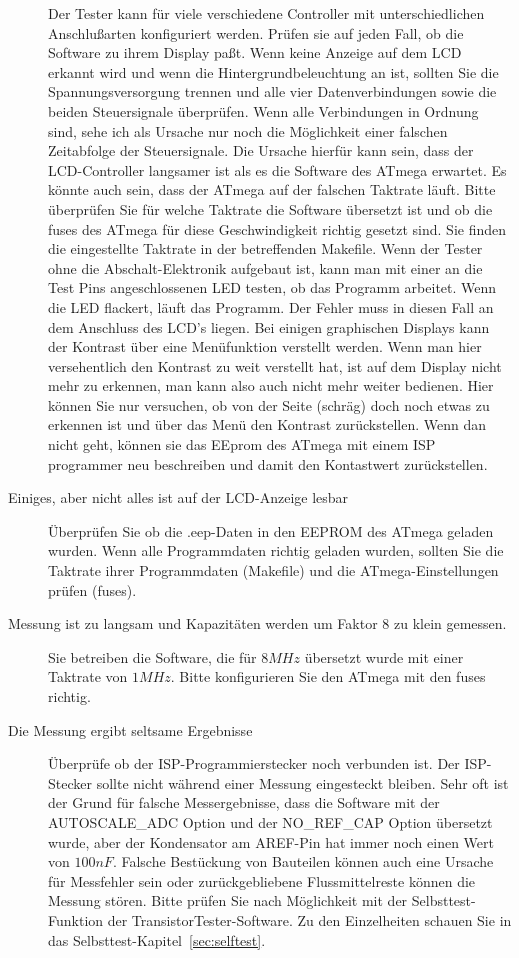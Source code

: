 \begin{description}
Der Tester kann für viele verschiedene Controller mit unterschiedlichen Anschlußarten
konfiguriert werden. Prüfen sie auf jeden Fall, ob die Software zu ihrem Display paßt.
Wenn keine Anzeige auf dem LCD erkannt wird und wenn die Hintergrundbeleuchtung an ist,
sollten Sie die Spannungsversorgung trennen und alle vier Datenverbindungen sowie die 
beiden Steuersignale überprüfen.
Wenn alle Verbindungen in Ordnung sind, sehe ich als Ursache nur noch die Möglichkeit einer
falschen Zeitabfolge der Steuersignale.
Die Ursache hierfür kann sein, dass der LCD-Controller langsamer ist als es die Software
des ATmega erwartet. Es könnte auch sein, dass der ATmega auf der falschen Taktrate läuft.
Bitte überprüfen Sie für welche Taktrate die Software übersetzt ist und ob
die fuses des ATmega für diese Geschwindigkeit richtig gesetzt sind.
Sie finden die eingestellte Taktrate in der betreffenden Makefile.
Wenn der Tester ohne die Abschalt-Elektronik aufgebaut ist, kann man mit einer
an die Test Pins angeschlossenen LED testen, ob das Programm arbeitet.
Wenn die LED flackert, läuft das Programm. Der Fehler muss in diesen Fall an
dem Anschluss des LCD's liegen. 
Bei einigen graphischen Displays kann der Kontrast über eine Menüfunktion verstellt werden.
Wenn man hier versehentlich den Kontrast zu weit verstellt hat, ist auf dem Display
nicht mehr zu erkennen, man kann also auch nicht mehr weiter bedienen.
Hier können Sie nur versuchen, ob von der Seite (schräg) doch noch etwas zu erkennen ist
und über das Menü den Kontrast zurückstellen. Wenn dan nicht geht, können sie
das EEprom des ATmega mit einem ISP programmer neu beschreiben und damit den Kontastwert zurückstellen.
\item[Einiges, aber nicht alles ist auf der LCD-Anzeige lesbar] 
Überprüfen Sie ob die .eep-Daten in den EEPROM des ATmega geladen wurden.
Wenn alle Programmdaten richtig geladen wurden, sollten Sie die Taktrate ihrer
Programmdaten (Makefile) und die ATmega-Einstellungen prüfen (fuses).

\item[Messung ist zu langsam und Kapazitäten werden um Faktor 8 zu klein gemessen.] 
Sie betreiben die Software, die für \(8MHz\) übersetzt wurde mit einer Taktrate von \(1MHz\).
Bitte konfigurieren Sie den ATmega mit den fuses richtig.

\item[Die Messung ergibt seltsame Ergebnisse]  
Überprüfe ob der ISP-Programmierstecker noch verbunden ist.
Der ISP-Stecker sollte nicht während einer Messung eingesteckt bleiben.
Sehr oft ist der Grund für falsche Messergebnisse, dass die Software mit der
 AUTOSCALE\_ADC Option und der NO\_REF\_CAP Option übersetzt wurde, aber der
Kondensator am AREF-Pin hat immer noch einen Wert von \(100nF\).
Falsche Bestückung von Bauteilen können auch eine Ursache für Messfehler sein 
oder zurückgebliebene Flussmittelreste können die Messung stören.
Bitte prüfen Sie nach Möglichkeit mit der Selbsttest-Funktion der
TransistorTester-Software.
Zu den Einzelheiten schauen Sie in das Selbsttest-Kapitel~\ref{sec:selftest}.


\end{description}
